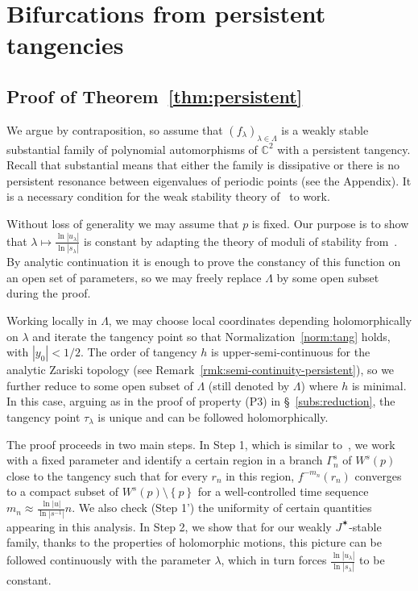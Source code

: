 \documentclass[11pt, oneside]{amsart}
\newcommand{\C}{\mathbb{C}}
\newcommand{\set}[1]{\left\{#1\right\}}
\newcommand{\abs}[1]{\left\vert#1\right\vert}
\newcommand{\jstar}{J^\varstar}
\newcommand{\inv}{^{-1}}
\DeclareMathOperator{\jac}{Jac}
\theoremstyle{remark}
\theoremstyle{definition}
\theoremstyle{theorem}
\newcommand{\commentaire}[1]{}
\begin{document}
\section{Bifurcations from persistent tangencies}\label{sec:persistent}

\subsection{Proof of Theorem~\ref{thm:persistent}} We argue by contraposition, so assume that
$(f_\lambda)_{\lambda\in \Lambda}$ is a   weakly stable substantial 
 family of polynomial automorphisms of $\C^2$ with a persistent tangency. 
 Recall that substantial means that either the family is dissipative or there is no persistent 
 resonance between eigenvalues of periodic points (see the Appendix). It is a necessary  condition 
 for  the weak stability theory of~\cite{tangencies} to work.
 
Without loss of generality  we may assume  that $p$ is fixed. Our purpose is to show that 
 $\lambda\mapsto \frac{\ln \abs{u_\lambda}}{\ln \abs{s_\lambda}}$ is constant by adapting the theory of moduli of stability from~\cite{palis_moduli, newhouse-palis-takens}. \commentaire{Incorrect sentence removed here, cf. Minor comment \#7.}
By analytic continuation 
 it is enough to prove the constancy of this function 
 on  an open set of parameters, 
 so   we may freely replace $\Lambda$ by some open subset during the proof. 
 
Working locally in $\Lambda$, we may choose local coordinates depending holomorphically on 
$\lambda$ and iterate the tangency point so that Normalization~\ref{norm:tang} holds, with $\abs{y_0}<1/2$. 
  The order of tangency $h$ is upper-semi-continuous for the analytic Zariski topology (see Remark~\ref{rmk:semi-continuity-persistent}), so we 
   further reduce to some  open 
 subset of $\Lambda$   (still denoted by $\Lambda$)
  where $h$ is minimal. In this  case, arguing as in the proof of property (P3) in 
 \S~\ref{subs:reduction},  
 the tangency point  $\tau_\lambda$ is unique and 
 can be followed holomorphically. 
 
 \commentaire{paragraph added for Exposition Comment \#4} The proof proceeds in two main steps. 
 In Step 1, which is similar to~\cite{palis_moduli}, we work with a fixed parameter and identify 
 a certain region in a branch $\Gamma_n^s$ of $W^s(p)$ close to the tangency
 such that for every $r_n$ in this region, $f^{-m_n}(r_n)$ converges to a compact subset of $W^s(p)\setminus\set{p}$ for a well-controlled time sequence $m_n\approx 
 \frac{\ln\abs{u}}{ \ln\abs{s\inv}} n$. 
 We also check (Step 1') the uniformity of certain quantities appearing in this analysis.  
  In Step 2, we show that for our weakly 
 $\jstar$-stable family, thanks to the properties of holomorphic motions, 
 this picture can be followed continuously with the parameter $\lambda$, which 
 in turn forces $\frac{\ln\abs{u_\lambda}}{ \ln\abs{s_\lambda}}$ to be constant. 
 
\end{document}
